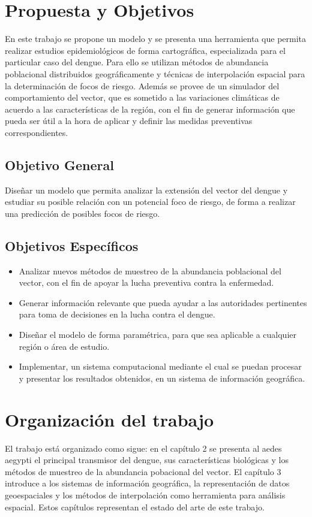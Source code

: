 \section{Propuesta y Objetivos}
En este trabajo se propone un modelo y se presenta una herramienta que permita realizar estudios
epidemiológicos de forma cartográfica, especializada para el particular caso del dengue. Para ello
se utilizan métodos de abundancia poblacional distribuidos geográficamente y técnicas de
interpolación espacial para la determinación de focos de riesgo. Además se provee de un simulador
del comportamiento del vector, que es sometido a las variaciones climáticas de acuerdo a las
características de la región, con el fin de generar información que pueda ser útil a la hora de
aplicar y definir las medidas preventivas correspondientes.

\subsection{Objetivo General}
Diseñar un modelo que permita analizar la extensión del vector del dengue y estudiar su posible
relación con un potencial foco de riesgo, de forma a realizar una predicción de posibles focos de
riesgo.

\subsection{Objetivos Específicos}

\begin{itemize}

\item Analizar nuevos métodos de muestreo de la abundancia poblacional del vector, con el fin de apoyar la lucha preventiva contra la enfermedad.

\item Generar información relevante que pueda ayudar a las autoridades pertinentes para toma de decisiones en la lucha contra el dengue.

\item Diseñar el modelo de forma paramétrica, para que sea aplicable a cualquier región o área de estudio.

\item Implementar, un sistema computacional mediante el cual se puedan procesar y presentar los resultados obtenidos, en un sistema de información geográfica.

\end{itemize}

\section{Organización del trabajo}
El trabajo está organizado como sigue: en el capítulo 2 se presenta al aedes aegypti el principal
transmisor del dengue, sus características biológicas y los métodos de muestreo de la abundancia
pobacional del vector. El capítulo 3 introduce a los sistemas de información geográfica, la
representación de datos geoespaciales y los métodos de interpolación como herramienta para
análisis espacial. Estos capítulos representan el estado del arte de este trabajo.

